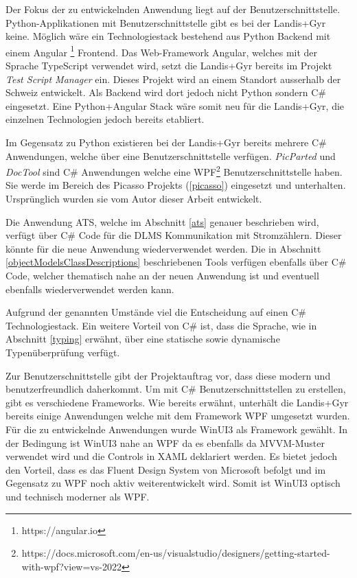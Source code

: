 Der Fokus der zu entwickelnden Anwendung liegt auf der Benutzerschnittstelle.
Python-Applikationen mit Benutzerschnittstelle gibt es bei der Landis+Gyr keine.
Möglich wäre ein Technologiestack bestehend aus Python Backend mit einem Angular \footnote{https://angular.io} Frontend.
Das Web-Framework Angular, welches mit der Sprache TypeScript verwendet wird, setzt die Landis+Gyr bereits im Projekt \textit{Test Script Manager} ein.
Dieses Projekt wird an einem Standort ausserhalb der Schweiz entwickelt.
Als Backend wird dort jedoch nicht Python sondern C\# eingesetzt.
Eine Python+Angular Stack wäre somit neu für die Landis+Gyr, die einzelnen Technologien jedoch bereits etabliert.

Im Gegensatz zu Python existieren bei der Landis+Gyr bereits mehrere C\# Anwendungen, welche über eine Benutzerschnittstelle verfügen.
\textit{PicParted} und \textit{DocTool} sind C\# Anwendungen welche eine \ac{WPF}\footnote{https://docs.microsoft.com/en-us/visualstudio/designers/getting-started-with-wpf?view=vs-2022} Benutzerschnittstelle haben.
Sie werde im Bereich des Picasso Projekts (\ref{picasso}) eingesetzt und unterhalten. 
Ursprünglich wurden sie vom Autor dieser Arbeit entwickelt.

Die Anwendung \ac{ATS}, welche im Abschnitt \ref{ats} genauer beschrieben wird, verfügt über C\# Code für die \ac{DLMS} Kommunikation mit Stromzählern.
Dieser könnte für die neue Anwendung wiederverwendet werden.
Die in Abschnitt \ref{objectModelsClassDescriptions} beschriebenen Tools verfügen ebenfalls über C\# Code, welcher thematisch nahe an der neuen Anwendung ist und eventuell ebenfalls wiederverwendet werden kann.

Aufgrund der genannten Umstände viel die Entscheidung auf einen C\# Technologiestack.
Ein weitere Vorteil von C\# ist, dass die Sprache, wie in Abschnitt \ref{typing} erwähnt, über eine statische sowie dynamische Typenüberprüfung verfügt.

Zur Benutzerschnittstelle gibt der Projektauftrag vor, dass diese modern und benutzerfreundlich daherkommt.
Um mit C\# Benutzerschnittstellen zu erstellen, gibt es verschiedene Frameworks.
Wie bereits erwähnt, unterhält die Landis+Gyr bereits einige Anwendungen welche mit dem Framework \ac{WPF} umgesetzt wurden.
Für die zu entwickelnde Anwendungen wurde WinUI3 als Framework gewählt.
In der Bedingung ist WinUI3 nahe an \ac{WPF} da es ebenfalls da \ac{MVVM}-Muster verwendet wird und die Controls in XAML deklariert werden.
Es bietet jedoch den Vorteil, dass es das Fluent Design System von Microsoft befolgt und im Gegensatz zu \ac{WPF} noch aktiv weiterentwickelt wird.
Somit ist WinUI3 optisch und technisch moderner als \ac{WPF}.

